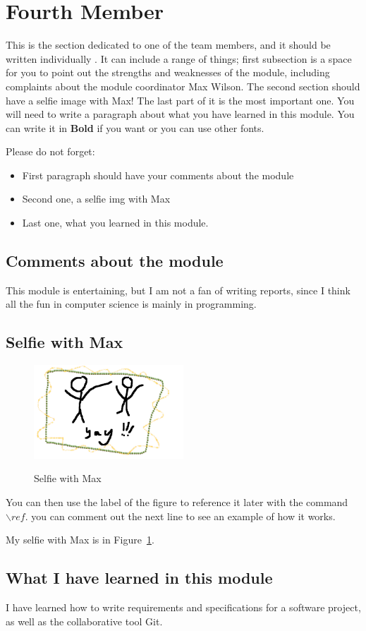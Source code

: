 \section{Fourth Member}
This is the section dedicated to one of the team members, and it should be written individually . It can include a range of things; first subsection is a space for you to point out the strengths and weaknesses of the module, including complaints about the module coordinator Max Wilson. The second section should have a selfie image with Max! The last part of it is the most important one. You will need to write a paragraph about what you have learned in this module. You can write it in \textbf{Bold} if you want or you can use other fonts. 

Please do not forget:
\begin{itemize}
	\item First paragraph should have your comments about the module
	\item Second one, a selfie img with Max
	\item Last one, what you learned in this module.
\end{itemize}

\subsection{Comments about the module}
This module is entertaining, but I am not a fan of writing reports, since I think all the fun in computer science is mainly in programming.

\subsection{Selfie with Max}
\begin{figure}[h]
\caption{Selfie with Max}
\centering
\includegraphics[width=0.5\textwidth]{4thPart_Selfie_With_Max.png}
\label{fig:selfie4}
\end{figure}

You can then use the label of the figure to reference it later with the command ${\backslash}ref$. you can comment out the next line to see an example of how it works.

 My selfie with Max is in  Figure~\ref{fig:selfie4}.

\subsection{What I have learned in this module}
I have learned how to write requirements and specifications for a software project, as well as the collaborative tool Git.
